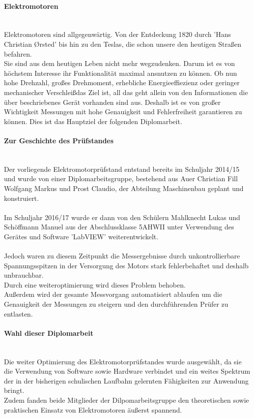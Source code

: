 \documentclass[12pt,a4paper]{article}
\begin{document}
\paragraph*{Elektromotoren}\mbox{}\\
	Elektromotoren sind allgegenwärtig. Von der Entdeckung 1820 durch 'Hans Christian \O rsted' bis hin 
	zu den Teslas, die schon unsere den heutigen Stra\ss en befahren. \\
	Sie sind aus dem heutigen Leben nicht mehr wegzudenken. 
	Darum ist es von höchstem Interesse ihr Funktionalität maximal ansnutzen zu können. 
	Ob nun hohe Drehzahl, gro\ss es Drehmoment, erhebliche Energieeffiezienz oder 
	geringer mechanischer 	Verschlei\ss  das Ziel ist, all das geht allein von den Informationen die über beschriebenes 
	Gerät vorhanden sind aus. 
	Deshalb ist es von gro\ss er Wichtigkeit Messungen mit hohe Genauigkeit und Fehlerfreiheit garantieren zu können. 
	Dies ist das Hauptziel der folgenden Diplomarbeit. 
%
\paragraph*{Zur Geschichte des Prüfstandes}\mbox{}\\
	Der vorliegende Elektromotorprüfstand entstand bereits im Schuljahr 2014/15 
	und wurde von einer Diplomarbeitsgruppe, bestehend aus Auer Christian Fill Wolfgang Markus und Prost Claudio, 
	der Abteilung Maschinenbau geplant und konstruiert. \\\\
%	
	Im Schuljahr 2016/17 wurde er dann von den Schülern Mahlknecht Lukas und Schöffmann Manuel 
	aus der Abschlussklasse 5AHWII unter Verwendung des Gerätes und Software 'LabVIEW' weiterentwickelt. \\\\
%
	Jedoch waren zu diesem Zeitpunkt die Messergebnisse durch unkontrollierbare Spannungsspitzen in der Versorgung 
	des Motors stark fehlerbehaftet und deshalb unbrauchbar. \\
	Durch eine weiteroptimierung wird dieses Problem behoben. \\
	Au\ss erdem wird der gesamte Messvorgang automatisiert ablaufen um die Genauigkeit der Messungen zu steigern 
	und den durchführenden Prüfer zu entlasten.
%	
\paragraph*{Wahl dieser Diplomarbeit}\mbox{}\\
	Die weiter Optimierung des Elektromotorprüfstandes wurde ausgewählt, da sie die Verwendung von 
	Software sowie Hardware verbindet und ein weites Spektrum der in der bisherigen schulischen Laufbahn 
	gelernten Fähigkeiten zur Anwendung bringt. \\
	Zudem fanden beide Mitglieder der Dilpomarbeitsgruppe den theoretischen sowie praktischen Einsatz von 
	Elektromotoren äu\ss erst spannend. \\
%
%
\newpage
\end{document}
